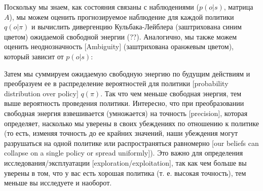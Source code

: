 \documentclass[twoside,leqno, 11pt]{article}
\begin{document}
	Поскольку мы знаем, как состояния связаны с наблюдениями ($p(o|s)$, матрица $A$), мы можем оценить прогнозируемое наблюдение для каждой политики $q(o|\pi)$ и вычислить дивергенцию Кульбака-Лейблера (заштрихована синим цветом) ожидаемой свободной энергии (??). Аналогично, мы также можем оценить неоднозначность [Ambiguity] (заштрихована оранжевым цветом), который зависит от $p(o|s)$:
	
	\begin{figure}[h]
	\end{figure}
	
	
	Затем мы суммируем ожидаемую свободную энергию по будущим действиям и преобразуем ее в распределение вероятностей для политики [probability distribution over policy] $q(\pi)$. Так что чем меньше свободная энергия, тем выше вероятность проведения политики. Интересно, что при преобразовании свободная энергия взвешивается (умножается) на точность [precision], которая определяет, насколько мы уверены в своих убеждениях по отношению к политике (то есть, изменяя точность до ее крайних значений, наши убеждения могут разрушаться на одной политике или распространяться равномерно [our beliefs can collapse on a single policy or spread uniformly]). Это важно для определения исследования/эксплуатации [exploration/exploitation], так как чем больше вы уверены в том, что у вас есть хорошая политика (т. е. высокая точность), тем меньше вы исследуете и наоборот.
	
	\begin{figure}[h]
	\end{figure}
	
\end{document}
